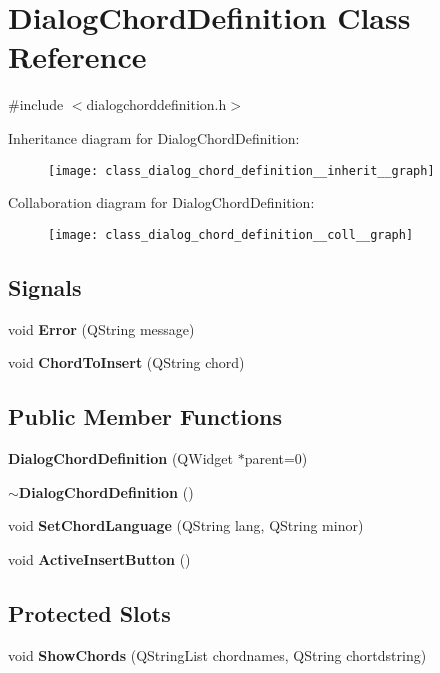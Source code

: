\section{Dialog\+Chord\+Definition Class Reference}
\label{class_dialog_chord_definition}


{\ttfamily \#include $<$dialogchorddefinition.\+h$>$}



Inheritance diagram for Dialog\+Chord\+Definition\+:\nopagebreak
\begin{figure}[H]
\begin{center}
\leavevmode
\texttt{[image: class\_dialog\_chord\_definition\_\_inherit\_\_graph]}
\end{center}
\end{figure}


Collaboration diagram for Dialog\+Chord\+Definition\+:\nopagebreak
\begin{figure}[H]
\begin{center}
\leavevmode
\texttt{[image: class\_dialog\_chord\_definition\_\_coll\_\_graph]}
\end{center}
\end{figure}
\subsection*{Signals}
\begin{DoxyCompactItemize}
\item 
void \textbf{ Error} (Q\+String message)
\item 
void \textbf{ Chord\+To\+Insert} (Q\+String chord)
\end{DoxyCompactItemize}
\subsection*{Public Member Functions}
\begin{DoxyCompactItemize}
\item 
\textbf{ Dialog\+Chord\+Definition} (Q\+Widget $\ast$parent=0)
\item 
\textbf{ $\sim$\+Dialog\+Chord\+Definition} ()
\item 
void \textbf{ Set\+Chord\+Language} (Q\+String lang, Q\+String minor)
\item 
void \textbf{ Active\+Insert\+Button} ()
\end{DoxyCompactItemize}
\subsection*{Protected Slots}
\begin{DoxyCompactItemize}
\item 
void \textbf{ Show\+Chords} (Q\+String\+List chordnames, Q\+String chortdstring)
\end{DoxyCompactItemize}


